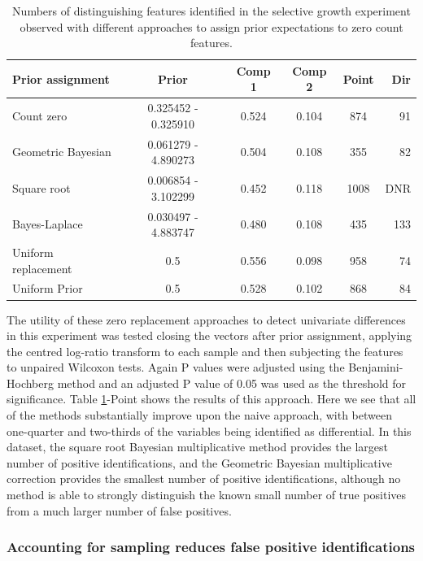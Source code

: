 \documentclass[article]{ajs}\usepackage[]{graphicx}\usepackage[]{color}
\begin{document}
\begin{table}[!htdp]
\caption{Numbers of distinguishing features identified in the selective growth experiment observed with different approaches to assign prior expectations to zero count features.}
\begin{center}
\begin{tabular}{lccccr}
Prior assignment  & Prior & Comp 1 & Comp 2 & Point & Dir\\ \hline
Count zero  & 0.325452 - 0.325910 & 0.524 & 0.104  & 874 & 91\\
Geometric Bayesian  & 0.061279 - 4.890273 &0.504 & 0.108 & 355 & 82\\
Square root  & 0.006854 - 3.102299 & 0.452 & 0.118 & 1008 & DNR\\
Bayes-Laplace & 0.030497 - 4.883747 & 0.480 & 0.108 & 435 & 133\\
Uniform replacement & 0.5 & 0.556 & 0.098 & 958 & 74\\
Uniform Prior  & 0.5 & 0.528 & 0.102 & 868 & 84\\

\end{tabular}
\end{center}
\label{tab:selex}
\end{table}%


The utility of these zero replacement approaches to detect univariate differences in this experiment was tested closing the  vectors after prior assignment, applying the centred log-ratio transform to each sample and then subjecting the features to  unpaired Wilcoxon tests. Again P values were adjusted using the Benjamini-Hochberg method and an adjusted P value of 0.05 was used as the threshold for significance. Table \ref{tab:selex}-Point shows the results of this approach. Here we see that all of the methods substantially improve upon the naive approach, with between one-quarter and two-thirds of the variables being identified as differential. In this dataset, the  square root Bayesian multiplicative method provides the largest number of positive identifications, and the Geometric Bayesian multiplicative correction provides the smallest number of positive identifications, although no method is able to strongly distinguish the known small number of true positives from a much larger number of false positives.

\subsubsection{Accounting for sampling reduces false positive identifications}
\end{document}
